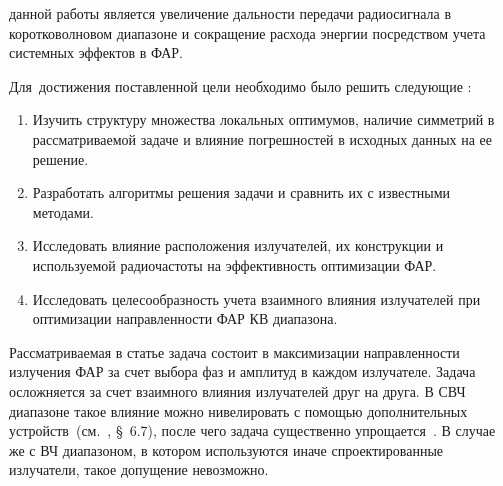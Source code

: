 
{\aim} данной работы является увеличение
дальности передачи радиосигнала в коротковолновом диапазоне и сокращение расхода энергии посредством учета системных эффектов в ФАР.

Для~достижения поставленной цели необходимо было решить следующие {\tasks}:
\begin{enumerate}[beginpenalty=10000] %
  \item Изучить структуру множества локальных оптимумов, наличие симметрий в рассматриваемой задаче
          и влияние погрешностей в исходных данных на ее решение. 
  \item Разработать алгоритмы решения задачи и сравнить их с известными методами.
  \item Исследовать влияние расположения излучателей, их конструкции и используемой радиочастоты на эффективность оптимизации ФАР.
  \item Исследовать целесообразность учета взаимного влияния излучателей при оптимизации направленности ФАР КВ диапазона.
\end{enumerate}


{\novelty}

Рассматриваемая в статье задача состоит в максимизации направленности излучения ФАР за счет выбора фаз и амплитуд в каждом излучателе. Задача осложняется за счет взаимного влияния излучателей друг на друга. В СВЧ диапазоне такое влияние можно нивелировать с помощью дополнительных устройств~(см.~\cite{sazonov:PAA}, \S~6.7), после чего задача существенно упрощается~\cite{indenbometal:synthesis}. В случае же с ВЧ диапазоном, в котором используются иначе спроектированные излучатели, такое допущение невозможно. 


